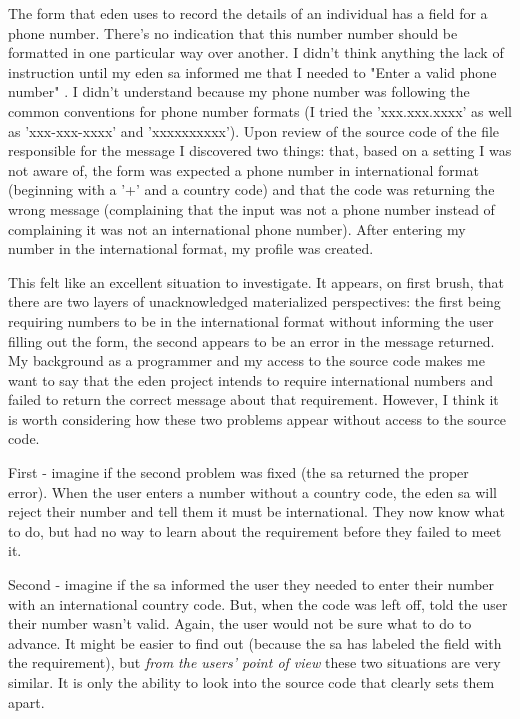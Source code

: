 \documentclass[a4paper,man,natbib,floatsintext]{apa6}
\begin{document}
   The form that \acrshort{eden} uses to record the details of an individual has a field for a phone number. There's no indication that this number number should be formatted in one particular way over another. I didn't think anything the lack of instruction until my \acrshort{eden} \gls{sa} informed me that I needed to "Enter a valid phone number" \citep{Konig2020-yx}. I didn't understand because my phone number was following the common conventions for phone number formats (I tried the 'xxx.xxx.xxxx' as well as 'xxx-xxx-xxxx' and 'xxxxxxxxxx'). Upon review of the source code of the file responsible for the message I discovered two things: that, based on a setting I was not aware of, the form was expected a phone number in international format (beginning with a '+' and a country code) and that the code was returning the wrong message (complaining that the input was not a phone number instead of complaining it was not an international phone number). After entering my number in the international format, my profile was created.

   This felt like an excellent situation to investigate. It appears, on first brush, that there are two layers of unacknowledged materialized perspectives: the first being requiring numbers to be in the international format without informing the user filling out the form, the second appears to be an error in the message returned. My background as a programmer and my access to the source code makes me want to say that the \acrshort{eden} project intends to require international numbers and failed to return the correct message about that requirement. However, I think it is worth considering how these two problems appear without access to the source code.

   First - imagine if the second problem was fixed (the \gls{sa} returned the proper error). When the user enters a number without a country code, the \acrshort{eden} \gls{sa} will reject their number and tell them it must be international. They now know what to do, but had no way to learn about the requirement before they failed to meet it.

   Second - imagine if the \gls{sa} informed the user they needed to enter their number with an international country code. But, when the code was left off, told the user their number wasn't valid. Again, the user would not be sure what to do to advance. It might be easier to find out (because the \gls{sa} has labeled the field with the requirement), but \textit{from the users' point of view} these two situations are very similar. It is only the ability to look into the source code that clearly sets them apart.
\end{document}
